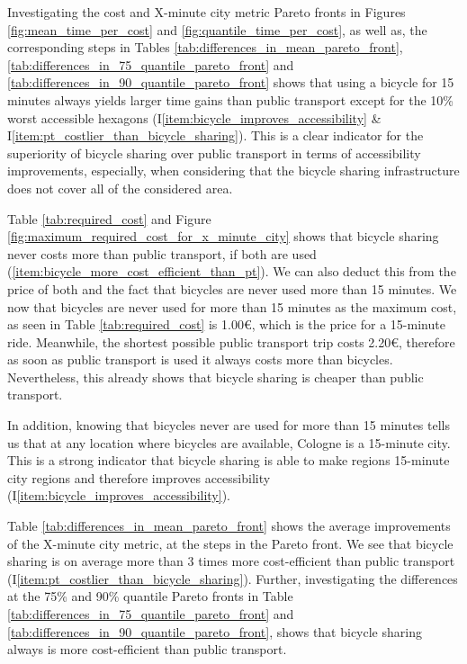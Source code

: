 Investigating the cost and X-minute city metric Pareto fronts in Figures \ref{fig:mean_time_per_cost} and \ref{fig:quantile_time_per_cost}, as well as, the corresponding steps in Tables \ref{tab:differences_in_mean_pareto_front}, \ref{tab:differences_in_75_quantile_pareto_front} and \ref{tab:differences_in_90_quantile_pareto_front} shows that using a bicycle for 15 minutes always yields larger time gains than public transport except for the 10\% worst accessible hexagons (I\ref{item:bicycle_improves_accessibility} \& I\ref{item:pt_costlier_than_bicycle_sharing}).
This is a clear indicator for the superiority of bicycle sharing over public transport in terms of accessibility improvements, especially, when considering that the bicycle sharing infrastructure does not cover all of the considered area.

Table \ref{tab:required_cost} and Figure \ref{fig:maximum_required_cost_for_x_minute_city} shows that bicycle sharing never costs more than public transport, if both are used (\ref{item:bicycle_more_cost_efficient_than_pt}).
We can also deduct this from the price of both and the fact that bicycles are never used more than 15 minutes.
We now that bicycles are never used for more than 15 minutes as the maximum cost, as seen in Table \ref{tab:required_cost} is 1.00€, which is the price for a 15-minute ride.
Meanwhile, the shortest possible public transport trip costs 2.20€, therefore as soon as public transport is used it always costs more than bicycles.
Nevertheless, this already shows that bicycle sharing is cheaper than public transport. 

In addition, knowing that bicycles never are used for more than 15 minutes tells us that at any location where bicycles are available, Cologne is a 15-minute city.
This is a strong indicator that bicycle sharing is able to make regions 15-minute city regions and therefore improves accessibility (I\ref{item:bicycle_improves_accessibility}).

Table \ref{tab:differences_in_mean_pareto_front} shows the average improvements of the X-minute city metric, at the steps in the Pareto front.
We see that bicycle sharing is on average more than 3 times more cost-efficient than public transport (I\ref{item:pt_costlier_than_bicycle_sharing}).
Further, investigating the differences at the 75\% and 90\% quantile Pareto fronts in Table \ref{tab:differences_in_75_quantile_pareto_front} and \ref{tab:differences_in_90_quantile_pareto_front}, shows that bicycle sharing always is more cost-efficient than public transport.

